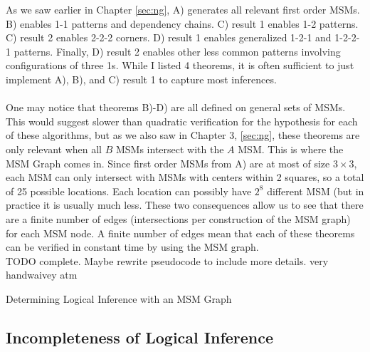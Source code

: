 As we saw earlier in Chapter \ref{sec:ng}, A) generates all relevant first order MSMs. B) enables 1-1 patterns and dependency chains. C) result 1 enables 1-2 patterns. C) result 2 enables 2-2-2 corners. D) result 1 enables generalized 1-2-1 and 1-2-2-1 patterns. Finally, D) result 2 enables other less common patterns involving configurations of three 1s. 
While I listed 4 theorems, it is often sufficient to just implement A), B), and C) result 1 to capture most inferences.\\\\

One may notice that theorems B)-D) are all defined on general sets of MSMs. This would suggest slower than quadratic verification for the hypothesis for each of these algorithms, but as we also saw in Chapter 3, \ref{sec:ng}, these theorems are only relevant when all $B$ MSMs intersect with the $A$ MSM. This is where the MSM Graph comes in. Since first order MSMs from A) are at most of size $3\times 3$, each MSM can only intersect with MSMs with centers within 2 squares, so a total of 25 possible locations. Each location can possibly have $2^8$ different MSM (but in practice it is usually much less. These two consequences allow us to see that there are a finite number of edges (intersections per construction of the MSM graph) for each MSM node. A finite number of edges mean that each of these theorems can be verified in constant time by using the MSM graph.\\


TODO complete. Maybe rewrite pseudocode to include more details. very handwaivey atm\\

\begin{algorithm}[h]
\caption*{Determining Logical Inference with an MSM Graph}
\begin{algorithmic}
\Repeat
        \EndIf
        \EndIf
    \EndIf
\EndFor
{}
\EndFunction
\end{algorithmic}
\end{algorithm}

\subsection{Incompleteness of Logical Inference} 

